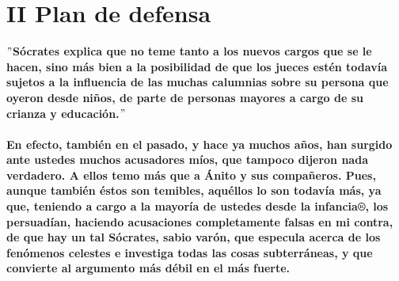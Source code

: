 \section*{\center II Plan de defensa}
\begin{multicols}{2}

$"$\textbf{Sócrates explica que no teme tanto a los nuevos cargos que se le hacen, sino más bien a la posibilidad de que los jueces estén todavía sujetos a la influencia de las muchas calumnias sobre su persona que oyeron desde niños, de parte de personas mayores a cargo de su crianza y educación.}$"$ \\\\
\textbf{En efecto, también en el pasado, y hace ya muchos años, han surgido ante ustedes muchos acusadores míos, que tampoco dijeron nada verdadero. A ellos temo más que a Ánito y sus compañeros. Pues, aunque también éstos son temibles, aquéllos lo son todavía más, ya que, teniendo a cargo a la mayoría de ustedes desde la infancia®, los persuadían, haciendo acusaciones completamente falsas en mi contra, de que hay un tal Sócrates, sabio varón, que especula acerca de los fenómenos celestes e investiga todas las cosas subterráneas, y que convierte al argumento más débil en el más fuerte.}

\end{multicols}


